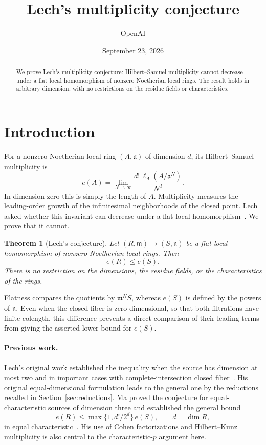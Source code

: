 \documentclass[11pt]{article}
\title{Lech's multiplicity conjecture}
\author{OpenAI}
\date{September 23, 2026}
\numberwithin{equation}{section}
\newtheorem{theorem}{Theorem}[section]
\theoremstyle{definition}
\DeclareMathOperator{\length}{\ell}
\begin{document}
\maketitle
\begin{abstract}
We prove Lech's multiplicity conjecture: Hilbert--Samuel multiplicity
cannot decrease under a flat local homomorphism of nonzero Noetherian
local rings. The result holds in arbitrary dimension, with no restrictions
on the residue fields or characteristics.
\end{abstract}

\section{Introduction}

For a nonzero Noetherian local ring $(A,\mathfrak a)$ of dimension $d$,
its Hilbert--Samuel multiplicity is
\[
 e(A)=\lim_{N\longrightarrow\infty}
       \frac{d!\,\length_A(A/\mathfrak a^N)}{N^d}.
\]
In dimension zero this is simply the length of $A$.
Multiplicity measures the leading-order growth of the infinitesimal
neighborhoods of the closed point. Lech asked whether this invariant
can decrease under a flat local homomorphism~\cite{Lech,Lech64}.
We prove that it cannot.

\begin{theorem}[Lech's conjecture]\label{thm:main}
Let $(R,\mathfrak m)\longrightarrow(S,\mathfrak n)$ be a flat local
homomorphism of nonzero Noetherian local rings. Then
\[
                         e(R)\leq e(S).
\]
There is no restriction on the dimensions, the residue fields, or the
characteristics of the rings.
\end{theorem}

Flatness compares the quotients by $\mathfrak m^N S$, whereas $e(S)$
is defined by the powers of $\mathfrak n$. Even when the closed fiber
is zero-dimensional, so that both filtrations have finite colength,
this difference prevents a direct comparison of their leading terms
from giving the asserted lower bound for $e(S)$.

\paragraph{Previous work.}
Lech's original work established the inequality when the source has
dimension at most two and in important cases with complete-intersection
closed fiber~\cite{Lech,Lech64}. His original equal-dimensional
formulation leads to the general one by the reductions recalled in
Section~\ref{sec:reductions}.
Ma proved the conjecture for equal-characteristic sources of
dimension three and established the general bound
\[
 e(R)\leq \max\{1,d!/2^d\}\,e(S),\qquad d=\dim R,
\]
in equal characteristic~\cite[Theorems~1.2 and~1.3]{Ma}.
His use of Cohen factorizations and Hilbert--Kunz multiplicity is
also central to the characteristic-$p$ argument here.
\end{document}

